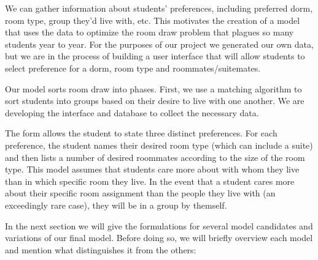 \documentclass[12pt]{article}
\begin{document}
    We can gather information about students' preferences, including preferred dorm, room type, group they'd live with, etc. This motivates the creation of a model that uses the data to optimize the room draw problem that plagues so many students year to year. For the purposes of our project we generated our own data, but we are in the process of building a user interface that will allow students to select preference for a dorm, room type and roommates/suitemates. 

    Our model sorts room draw into phases. First, we use a matching algorithm to sort students into groups based on their desire to live with one another. We are developing the interface and database to collect the necessary data.  
    
    The form allows the student to state three distinct preferences. For each preference, the student names their desired room type (which can include a suite) and then lists a number of desired roommates according to the size of the room type. This model assumes that students care more about with whom they live than in which specific room they live. In the event that a student cares more about their specific room assignment than the people they live with (an exceedingly rare case), they will be in a group by themself.
    
    In the next section we will give the formulations for several model candidates and variations of our final model. Before doing so, we will briefly overview each model and mention what distinguishes it from the others:
\end{document}
